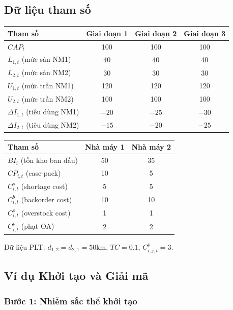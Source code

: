 \documentclass[12pt]{article}
\begin{document}
\subsection{Dữ liệu tham số}

\begin{center}
\begin{tabular}{lccc}
\toprule
\textbf{Tham số} & \textbf{Giai đoạn 1} & \textbf{Giai đoạn 2} & \textbf{Giai đoạn 3} \\
\midrule
$CAP_t$ & 100 & 100 & 100 \\
$L_{1,t}$ (mức sàn NM1) & 40 & 40 & 40 \\
$L_{2,t}$ (mức sàn NM2) & 30 & 30 & 30 \\
$U_{1,t}$ (mức trần NM1) & 120 & 120 & 120 \\
$U_{2,t}$ (mức trần NM2) & 100 & 100 & 100 \\
$\Delta I_{1,t}$ (tiêu dùng NM1) & $-20$ & $-25$ & $-30$ \\
$\Delta I_{2,t}$ (tiêu dùng NM2) & $-15$ & $-20$ & $-25$ \\
\bottomrule
\end{tabular}
\end{center}

\begin{center}
\begin{tabular}{lcc}
\toprule
\textbf{Tham số} & \textbf{Nhà máy 1} & \textbf{Nhà máy 2} \\
\midrule
$BI_i$ (tồn kho ban đầu) & 50 & 35 \\
$CP_{i,t}$ (case-pack) & 10 & 5 \\
$C^s_{i,t}$ (shortage cost) & 5 & 5 \\
$C^b_{i,t}$ (backorder cost) & 10 & 10 \\
$C^o_{i,t}$ (overstock cost) & 1 & 1 \\
$C^p_{i,t}$ (phạt OA) & 2 & 2 \\
\end{tabular}
\end{center}

Dữ liệu PLT: $d_{1,2} = d_{2,1} = 50$km, $TC = 0.1$, $C^p_{i,j,t} = 3$.

\subsection{Ví dụ Khởi tạo và Giải mã}

\subsubsection*{Bước 1: Nhiễm sắc thể khởi tạo}
\end{document}
